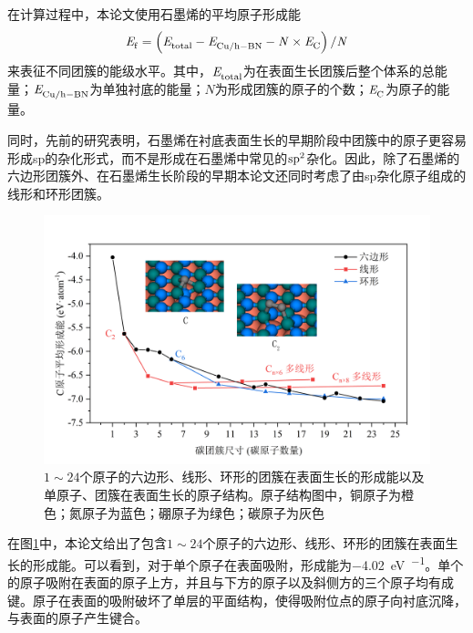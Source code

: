     在计算过程中，本论文使用石墨烯的平均原子形成能
    $$\it E_{\rm f}^{\rm } \it=\left(\it E_{\rm total}^{\rm } \it-\it E_{\rm Cu/h-BN}^{\rm } \it-N\times \it E_{\rm C}^{\rm } \it\right)\slash N$$
    来表征不同团簇的能级水平。其中，$\it E_{\rm total}^{\rm } \it$为在表面生长团簇后整个体系的总能量；$\it E_{\rm Cu/h-BN}^{\rm } \it$为单独衬底的能量；$N$为形成团簇的原子的个数；$\it E_{\rm C}^{\rm } \it$为原子的能量。

    同时，先前的研究表明，石墨烯在衬底表面生长的早期阶段中团簇中的原子更容易形成sp的杂化形式，而不是形成在石墨烯中常见的$\rm sp^2$杂化。因此，除了石墨烯的六边形团簇外、在石墨烯生长阶段的早期本论文还同时考虑了由sp杂化原子组成的线形和环形团簇。

    \begin{figure}[htb]
        \includegraphics{pic/CG_DFT_C_cluster_onBN.png}
        \caption{$1 \sim 24$个原子的六边形、线形、环形的团簇在表面生长的形成能以及单原子、团簇在表面生长的原子结构。原子结构图中，铜原子为橙色；氮原子为蓝色；硼原子为绿色；碳原子为灰色}
        \label{fig:CG_DFT_C_cluster_onBN}
    \end{figure}

    在图\ref{fig:CG_DFT_C_cluster_onBN}中，本论文给出了包含$1 \sim 24$个原子的六边形、线形、环形的团簇在表面生长的形成能。可以看到，对于单个原子在表面吸附，形成能为\SI{-4.02}{\electronvolt\per\atom}。单个的原子吸附在表面的原子上方，并且与下方的原子以及斜侧方的三个原子均有成键。原子在表面的吸附破坏了单层的平面结构，使得吸附位点的原子向衬底沉降，与表面的原子产生键合。

